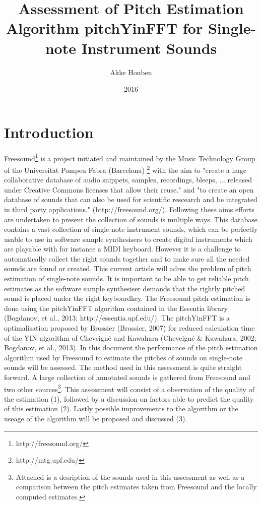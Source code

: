 \documentclass{article}
\title{Assessment of Pitch Estimation Algorithm pitchYinFFT for Single-note Instrument Sounds}
\author{Akke Houben}
\date{2016}
\begin{document}
\maketitle

\section{Introduction}
Freesound\footnote{http://freesound.org/} is a project initiated and maintained by the Music Technology Group of the Universitat Pompeu Fabra (Barcelona) \footnote{http://mtg.upf.edu/} with the aim to "create a huge collaborative database of audio snippets, samples, recordings, bleeps, ... released under Creative Commons licenses that allow their reuse." and "to create an open database of sounds that can also be used for scientific rescearch and be integrated in third party applications." (http://freesound.org/). Following these aims efforts are undertaken to present the collection of sounds is multiple ways. This database contains a vast collection of single-note instrument sounds, which can be perfectly usable to use in software sample synthesisers to create digital instruments which are playable with for instance a MIDI keyboard. However it is a challenge to automatically collect the right sounds together and to make sure all the needed sounds are found or created. This current article will adres the problem of pitch estimation of single-note sounds. It is important to be able to get reliable pitch estimates as the software sample synthesiser demands that the rightly pitched sound is placed under the right keyboardkey. The Freesound pitch estimation is done using the pitchYinFFT algorithm contained in the Essentia library (Bogdanov, et al., 2013; http://essentia.upf.edu/). The pitchYinFFT is a optimalisation proposed by Brossier (Brossier, 2007) for reduced calculation time of the YIN algorithm of Cheveigné and Kawahara (Cheveigné & Kawahara, 2002; Bogdanov, et al., 2013). 
In this document the performance of the pitch estimation algorithm used by Freesound to estimate the pitches of sounds on single-note sounds will be assessed. The method used in this assessment is quite straight forward. A large collection of annotated sounds is gathered from Freesound and two other sources\footnote{Attached is a desription of the sounds used in this assessment as well as a comparison between the pitch estimates taken from Freesound and the locally computed estimates.}.
 This assessment will consist of a observation of the quality of the estimation (1), followed by a discussion on factors able to predict the quality of this estimation (2). Lastly possible improvements to the algorithm or the useage of the algorithm will be proposed and discussed (3).
\end{document}
